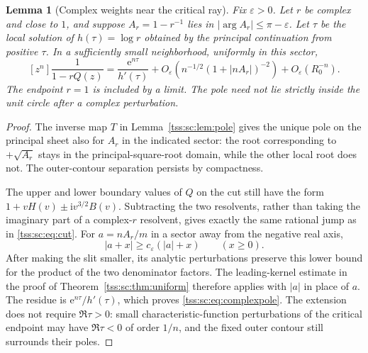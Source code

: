 \documentclass[11pt]{article}
\newtheorem{lemma}[theorem]{Lemma}
\theoremstyle{remark}\newtheorem{remark}[theorem]{Remark}
\theoremstyle{definition}\newtheorem{definition}[theorem]{Definition}
\newcommand{\ii}{\mathrm i}
\newcommand{\e}{\mathrm e}
\begin{document}
\begin{lemma}[Complex weights near the critical ray]\label{tss:sc:lem:complex}
Fix $\varepsilon>0$. Let $r$ be complex and close to $1$, and suppose $A_r=1-r^{-1}$ lies in $|\arg A_r|\leq\pi-\varepsilon$. Let $\tau$ be the local solution of $h(\tau)=\log r$ obtained by the principal continuation from positive $\tau$. In a sufficiently small neighborhood, uniformly in this sector,
\begin{equation}\label{tss:sc:eq:complexpole}
 [z^n]\frac1{1-rQ(z)}
 =\frac{\e^{n\tau}}{h'(\tau)}
 +O_\varepsilon\left(n^{-1/2}(1+|nA_r|)^{-2}\right)
 +O_\varepsilon(R_0^{-n}).
\end{equation}
The endpoint $r=1$ is included by a limit. The pole need not lie strictly inside the unit circle after a complex perturbation.
\end{lemma}
\begin{proof}
The inverse map $T$ in Lemma~\ref{tss:sc:lem:pole} gives the unique pole on the principal sheet also for $A_r$ in the indicated sector: the root corresponding to $+\sqrt{A_r}$ stays in the principal-square-root domain, while the other local root does not. The outer-contour separation persists by compactness.

The upper and lower boundary values of $Q$ on the cut still have the form $1+vH(v)\pm\ii v^{3/2}B(v)$. Subtracting the two resolvents, rather than taking the imaginary part of a complex-$r$ resolvent, gives exactly the same rational jump as in \eqref{tss:sc:eq:cut}. For $a=nA_r/m$ in a sector away from the negative real axis,
\[
 |a+x|\geq c_\varepsilon(|a|+x)\qquad(x\geq0).
\]
After making the slit smaller, its analytic perturbations preserve this lower bound for the product of the two denominator factors. The leading-kernel estimate in the proof of Theorem~\ref{tss:sc:thm:uniform} therefore applies with $|a|$ in place of $a$. The residue is $\e^{n\tau}/h'(\tau)$, which proves \eqref{tss:sc:eq:complexpole}. The extension does not require $\Re\tau>0$: small characteristic-function perturbations of the critical endpoint may have $\Re\tau<0$ of order $1/n$, and the fixed outer contour still surrounds their poles.
\end{proof}
\end{document}
